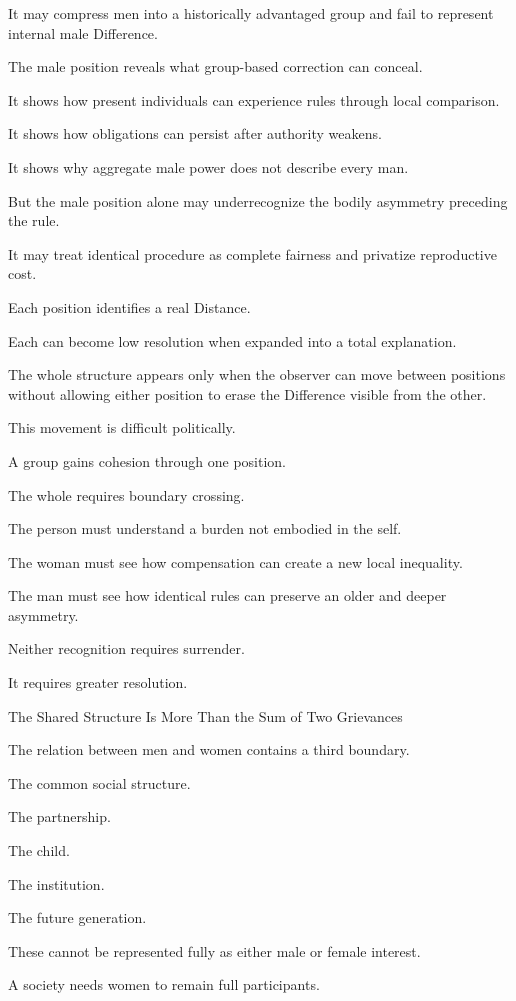 It may compress men into a historically advantaged group and fail to represent internal male Difference.

The male position reveals what group-based correction can conceal.

It shows how present individuals can experience rules through local comparison.

It shows how obligations can persist after authority weakens.

It shows why aggregate male power does not describe every man.

But the male position alone may underrecognize the bodily asymmetry preceding the rule.

It may treat identical procedure as complete fairness and privatize reproductive cost.

Each position identifies a real Distance.

Each can become low resolution when expanded into a total explanation.

The whole structure appears only when the observer can move between positions without allowing either position to erase the Difference visible from the other.

This movement is difficult politically.

A group gains cohesion through one position.

The whole requires boundary crossing.

The person must understand a burden not embodied in the self.

The woman must see how compensation can create a new local inequality.

The man must see how identical rules can preserve an older and deeper asymmetry.

Neither recognition requires surrender.

It requires greater resolution.

The Shared Structure Is More Than the Sum of Two Grievances

The relation between men and women contains a third boundary.

The common social structure.

The partnership.

The child.

The institution.

The future generation.

These cannot be represented fully as either male or female interest.

A society needs women to remain full participants.

